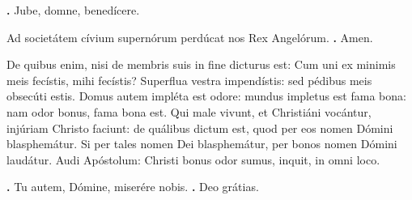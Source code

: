 \begin{small}
\textbf{\Vbar.} Jube, domne, benedícere.

Ad societátem cívium supernórum perdúcat nos Rex Angelórum. \textbf{\Rbar.} Amen.
\end{small}


De quibus enim, nisi de membris suis in fine dicturus est: Cum uni ex minimis meis fecístis, mihi fecístis? Superflua vestra impendístis: sed pédibus meis obsecúti estis. Domus autem impléta est odore: mundus impletus est fama bona: nam odor bonus, fama bona est. Qui male vivunt, et Christiáni vocántur, injúriam Christo faciunt: de quálibus dictum est, quod per eos nomen Dómini blasphemátur. Si per tales nomen Dei blasphemátur, per bonos nomen Dómini laudátur. Audi Apóstolum: Christi bonus odor sumus, inquit, in omni loco.

\textbf{\Vbar.} Tu autem, Dómine, miserére nobis.
\textbf{\Rbar.} Deo grátias.

